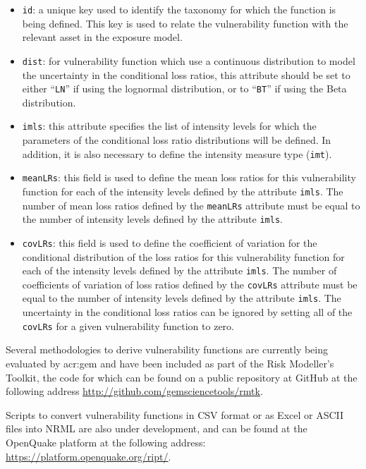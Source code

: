 \begin{itemize}

    \item \Verb+id+: a unique key used to identify the \gls{taxonomy} for 
    which the function is being defined. This key is used to relate the 
    \gls{vulnerability function} with the relevant \gls{asset} in the 
    \gls{exposure model}.

    \item \Verb+dist+: for vulnerability function which use a continuous 
    distribution to model the uncertainty in the conditional loss ratios, 
    this attribute should be set to either ``\Verb+LN+'' if using the lognormal
    distribution, or to ``\Verb+BT+'' if using the Beta distribution.

    \item \Verb+imls+: this attribute specifies the list of intensity levels
    for which the parameters of the conditional loss ratio distributions will
    be defined. In addition, it is also necessary to define the intensity 
    measure type (\Verb+imt+).

    \item \Verb+meanLRs+: this field is used to define the mean loss ratios
    for this \gls{vulnerability function} for each of the intensity levels
    defined by the attribute \Verb+imls+. The number of mean loss ratios
    defined by the \Verb+meanLRs+ attribute must be equal to the number of
    intensity levels defined by the attribute \Verb+imls+.

    \item \Verb+covLRs+: this field is used to define the coefficient of 
    variation for the conditional distribution of the loss ratios for this
    \gls{vulnerability function} for each of the intensity levels defined by
    the attribute \Verb+imls+. The number of coefficients of variation of loss
    ratios defined by the \Verb+covLRs+ attribute must be equal to the number
    of intensity levels defined by the attribute \Verb+imls+. The uncertainty
    in the conditional loss ratios can be ignored by setting all of the
    \Verb+covLRs+ for a given \gls{vulnerability function} to zero.

\end{itemize}

Several methodologies to derive \glspl{vulnerability function} are currently being
evaluated by \gls{acr:gem} and have been included as part of the Risk
Modeller's Toolkit, the code for which can be found on a public repository at
GitHub at the following address
\href{http://github.com/gemsciencetools/rmtk}{http://github.com/gemsciencetools/rmtk}.

Scripts to convert \glspl{vulnerability function} in CSV format or as Excel or
ASCII files into NRML are also under development, and can be found at the
OpenQuake platform at the following address:
\href{https://platform.openquake.org/ript/}{https://platform.openquake.org/ript/}.

